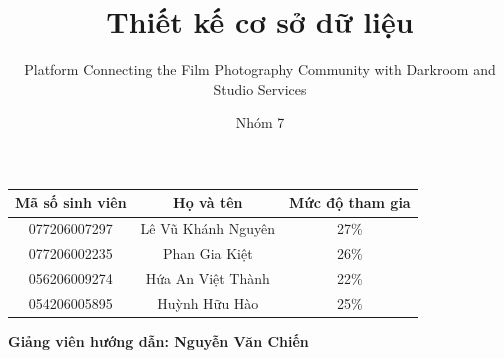 \documentclass[letterpaper,11pt,leqno]{book}
\begin{document}
\title{Thiết kế cơ sở dữ liệu}
\subtitle{Platform Connecting the Film Photography Community with Darkroom and Studio Services}
\author{Nhóm 7}

\begin{titlepage}
\maketitle

\vspace{1em}
\begin{table}[htbp]
\centering
\begin{tabular}{|c|c|c|}
\hline
\textbf{Mã số sinh viên} & \textbf{Họ và tên} & \textbf{Mức độ tham gia} \\
\hline
077206007297 & Lê Vũ Khánh Nguyên & 27\% \\
\hline
077206002235 & Phan Gia Kiệt & 26\% \\
\hline
056206009274 & Hứa An Việt Thành & 22\% \\
\hline
054206005895 & Huỳnh Hữu Hào & 25\% \\
\hline
\end{tabular}
\end{table}

\vspace{1em}
\begin{center}
\textbf{Giảng viên hướng dẫn: Nguyễn Văn Chiến}
\end{center}
\end{titlepage}


\frontmatter
\tableofcontents
\mainmatter





\end{document}
